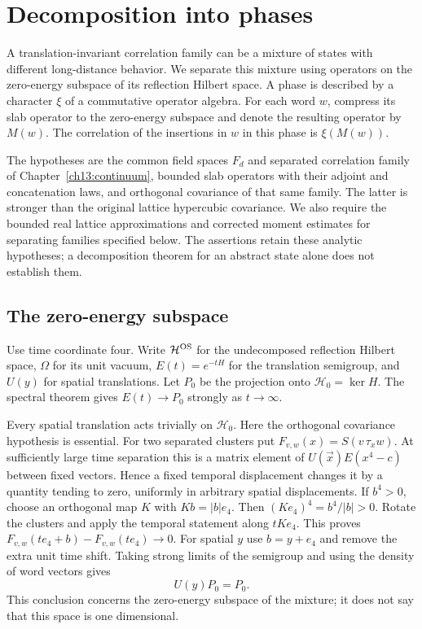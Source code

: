 \chapter{Decomposition into phases}
\label{ch15:phases}

A translation-invariant correlation family can be a mixture of states
with different long-distance behavior. We separate this mixture using
operators on the zero-energy subspace of its reflection Hilbert space.
A phase is described by a character $\xi$ of a commutative operator
algebra. For each word $w$, compress its slab operator to the zero-energy
subspace and denote the resulting operator by $M(w)$. The correlation
of the insertions in $w$ in this phase is $\xi(M(w))$.

The hypotheses are the common field spaces $F_d$ and separated correlation
family of Chapter~\ref{ch13:continuum}, bounded slab operators with
their adjoint and concatenation laws, and orthogonal covariance of that
same family. The latter is stronger than the original lattice
hypercubic covariance. We also require the bounded real lattice
approximations and corrected moment estimates for separating families specified below.
The assertions retain these analytic hypotheses; a decomposition theorem
for an abstract state alone does not establish them.

\section{The zero-energy subspace}
\label{ch15:ground}

Use time coordinate four. Write $\mathcal H^{\rm OS}$ for the undecomposed
reflection Hilbert space, $\Omega$ for its unit vacuum,
$E(t)=e^{-tH}$ for the translation semigroup, and $U(y)$ for spatial
translations. Let $P_0$ be the projection onto
$\mathcal H_0=\ker H$. The spectral theorem gives
$E(t)\to P_0$ strongly as $t\to\infty$.

Every spatial translation acts trivially on $\mathcal H_0$.
Here the orthogonal covariance hypothesis is essential. For two separated
clusters put $F_{v,w}(x)=S(v\,\tau_xw)$. At sufficiently large time
separation this is a matrix element of $U(\vec x)E(x^4-c)$ between
fixed vectors. Hence a fixed temporal displacement changes it by a
quantity tending to zero, uniformly in arbitrary spatial displacements.
If $b^4>0$, choose an orthogonal map $K$ with $Kb=|b|e_4$.
Then $(Ke_4)^4=b^4/|b|>0$. Rotate the clusters and apply the temporal
statement along $tKe_4$. This proves
$F_{v,w}(te_4+b)-F_{v,w}(te_4)\to0$.
For spatial $y$ use $b=y+e_4$ and remove the extra unit time shift.
Taking strong limits of the semigroup and using the density of word vectors gives
\begin{equation}
                              U(y)P_0=P_0.
 \label{ch15:spatial-ground}
\end{equation}
This conclusion concerns the zero-energy subspace of the mixture; it does not
say that this space is one dimensional.

